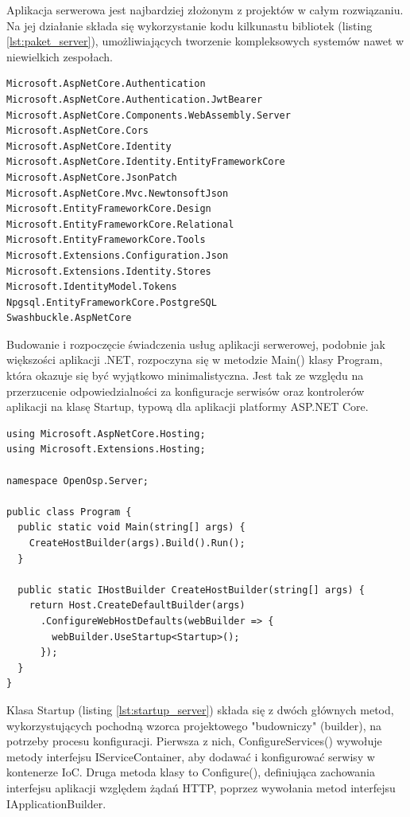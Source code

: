 Aplikacja serwerowa jest najbardziej złożonym z projektów w całym rozwiązaniu. Na jej działanie składa się wykorzystanie kodu kilkunastu bibliotek (listing \ref{lst:paket_server}), umożliwiających tworzenie kompleksowych systemów nawet w niewielkich zespołach.

\begin{lstlisting}[language=CSharp, caption=Plik menadżera pakietów stanowiący spis referencji do zewnętrznych bibliotek .NET w aplikacji serwerowej, label=lst:paket_server]
Microsoft.AspNetCore.Authentication
Microsoft.AspNetCore.Authentication.JwtBearer
Microsoft.AspNetCore.Components.WebAssembly.Server
Microsoft.AspNetCore.Cors
Microsoft.AspNetCore.Identity
Microsoft.AspNetCore.Identity.EntityFrameworkCore
Microsoft.AspNetCore.JsonPatch
Microsoft.AspNetCore.Mvc.NewtonsoftJson
Microsoft.EntityFrameworkCore.Design
Microsoft.EntityFrameworkCore.Relational
Microsoft.EntityFrameworkCore.Tools
Microsoft.Extensions.Configuration.Json
Microsoft.Extensions.Identity.Stores
Microsoft.IdentityModel.Tokens
Npgsql.EntityFrameworkCore.PostgreSQL
Swashbuckle.AspNetCore
\end{lstlisting}

Budowanie i rozpoczęcie świadczenia usług aplikacji serwerowej, podobnie jak większości aplikacji .NET, rozpoczyna się w metodzie Main() klasy Program, która okazuje się być wyjątkowo minimalistyczna. Jest tak ze względu na przerzucenie odpowiedzialności za konfiguracje serwisów oraz kontrolerów aplikacji na klasę Startup, typową dla aplikacji platformy ASP.NET Core.

\begin{lstlisting}[language=CSharp, caption=Klasa Program w aplikacji serwerowej rozwiązania, label=lst:program_server]
using Microsoft.AspNetCore.Hosting;
using Microsoft.Extensions.Hosting;

namespace OpenOsp.Server; 

public class Program {
  public static void Main(string[] args) {
    CreateHostBuilder(args).Build().Run();
  }

  public static IHostBuilder CreateHostBuilder(string[] args) {
    return Host.CreateDefaultBuilder(args)
      .ConfigureWebHostDefaults(webBuilder => {
        webBuilder.UseStartup<Startup>();
      });
  }
}
\end{lstlisting}

Klasa Startup (listing \ref{lst:startup_server}) składa się z dwóch głównych metod, wykorzystujących pochodną wzorca projektowego "budowniczy" (builder), na potrzeby procesu konfiguracji. Pierwsza z nich, ConfigureServices() wywołuje metody interfejsu IServiceContainer, aby dodawać i konfigurować serwisy w kontenerze IoC. Druga metoda klasy to Configure(), definiująca  zachowania interfejsu aplikacji względem żądań HTTP, poprzez wywołania metod interfejsu IApplicationBuilder. 

